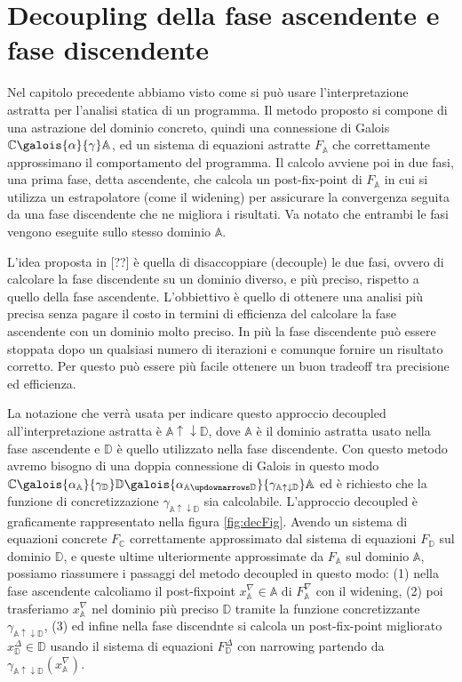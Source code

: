 \chapter{Decoupling della fase ascendente e fase discendente}\label{chapter:decoupling}

Nel capitolo precedente abbiamo visto come si può usare l'interpretazione astratta per l'analisi statica di un programma. Il metodo proposto si compone di una astrazione del dominio concreto, quindi una connessione di Galois \(\mathbb{C}\galois{\alpha}{\gamma}\mathbb{A}\),  ed un sistema di equazioni  astratte \(F_{\mathbb{A}}\) che correttamente approssimano il comportamento del programma. Il calcolo avviene poi in due fasi, una prima fase, detta ascendente, che calcola un post-fix-point di \(F_{\mathbb{A}}\) in cui si utilizza un estrapolatore (come il widening) per assicurare la convergenza seguita da una fase discendente che ne migliora i risultati. Va notato che entrambi le fasi vengono eseguite sullo stesso dominio \(\mathbb{A}\).

L'idea proposta in [??] è quella di disaccoppiare (decouple) le due fasi, ovvero di calcolare la fase discendente su un dominio diverso, e più preciso, rispetto a quello della fase ascendente. L'obbiettivo è quello di ottenere una analisi più precisa senza pagare il costo in termini di efficienza del calcolare la fase ascendente con un dominio molto preciso. In più la fase discendente può essere stoppata dopo un qualsiasi numero di iterazioni e comunque fornire un risultato corretto. Per questo può essere più facile ottenere un buon tradeoff tra precisione ed efficienza.

La notazione che verrà usata per indicare questo approccio decoupled all'interpretazione astratta è \(\mathbb{A}\uparrow\downarrow\mathbb{D}\), dove \(\mathbb{A}\) è il dominio astratta usato nella fase ascendente e \(\mathbb{D}\) è quello utilizzato nella fase discendente. Con questo metodo avremo bisogno di una doppia connessione di Galois in questo modo \(\mathbb{C}\galois{\alpha_{\mathbb{A}}}{\gamma_{\mathbb{D}}}\mathbb{D}\galois{\alpha_{\mathbb{A}\updownarrows\mathbb{D}}}{\gamma_{\mathbb{A}\uparrow\downarrow\mathbb{D}}}\mathbb{A}\) ed è richiesto che la funzione di concretizzazione \(\gamma_{\mathbb{A}\uparrow\downarrow\mathbb{D}}\) sia calcolabile. L'approccio decoupled è graficamente rappresentato nella figura \ref{fig:decFig}. Avendo un sistema di equazioni concrete \(F_{\mathbb{C}}\) correttamente approssimato dal sistema di equazioni \(F_{\mathbb{D}}\) sul dominio \(\mathbb{D}\), e queste ultime ulteriormente approssimate da \(F_{\mathbb{A}}\) sul dominio \(\mathbb{A}\), possiamo riassumere i passaggi del metodo decoupled in questo modo: (1) nella fase ascendente calcoliamo il post-fixpoint \(x^{\nabla}_{\mathbb{A}}\in\mathbb{A}\) di \(F^{\nabla}_{\mathbb{A}}\) con il widening, (2) poi trasferiamo \(x^{\nabla}_{\mathbb{A}}\) nel dominio più preciso \(\mathbb{D}\) tramite la funzione concretizzante \(\gamma_{\mathbb{A}\uparrow\downarrow\mathbb{D}}\), (3) ed infine nella fase discendnte si calcola un post-fix-point migliorato \(x^{\Delta}_{\mathbb{D}}\in\mathbb{D}\) usando il sistema di equazioni \(F^{\Delta}_{\mathbb{D}}\) con narrowing partendo da  \(\gamma_{\mathbb{A}\uparrow\downarrow\mathbb{D}}(x^{\nabla}_{\mathbb{A}})\).


